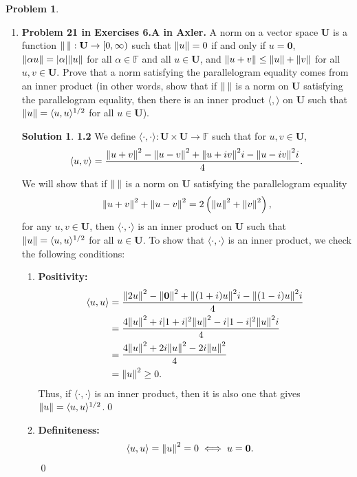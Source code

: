\documentclass{book}
\theoremstyle{definition}
\newtheorem*{prob*}{Problem}
\newtheorem*{sln*}{Solution}
\newcommand{\U}{\mathbf{U}}
\newcommand{\la}{\langle}
\newcommand{\ra}{\rangle}
\begin{document}
\begin{prob*}
\begin{enumerate}
		
		\newpage
		
		
		
		\item \textbf{Problem 21 in Exercises 6.A in Axler.} A norm on a vector space $\U$ is a function $\norm{\,}: \U \to [0,\infty) $ such that $\norm{u} = 0$ if and only if $u = \mathbf{0}$, $\norm{\alpha u} = \vert \alpha \vert \norm{u}$ for all $\alpha \in \mathbb{F}$ and all $u \in \U$, and $\norm{u + v} \leq \norm{u} + \norm{v}$ for all $u,v \in \U$. Prove that a norm satisfying the parallelogram equality comes from an inner product (in other words, show that if $\norm{\,}$ is a norm on $\U$ satisfying the parallelogram equality, then there is an inner product $\la ,\ra$ on $\U$ such that $\norm{u} = \la u,u\ra^{1/2}$ for all $u\in \U$). 
		
		
		\begin{sln*}\textbf{1.2}
			We define $\la \cdot,\cdot \ra : \U \times \U \to \mathbb{F}$ such that for $u,v \in \U$,
			\begin{align*}
			\la u ,v \ra = \frac{\norm{u+ v}^2  - \norm{u-v}^2 + \norm{u + iv}^2i - \norm{u - iv}^2i   }{4}.
			\end{align*} 
			We will show that if $\norm{\,}$ is a norm on $\U$ satisfying the parallelogram equality 
			\begin{align*}
			\norm{u+v}^2 + \norm{u-v}^2 = 2   \left( \norm{u}^2 + \norm{v}^2 \right),
			\end{align*}
			for any $u,v \in \U$, then $\la \cdot,\cdot\ra$ is an inner product on $\U$ such that $\norm{u} = \la u,u\ra^{1/2}$ for all $u\in \U$.  To show that $\la \cdot , \cdot \ra$ is an inner product, we check the following conditions:
			\begin{enumerate}
				\item \textbf{Positivity:}
				\begin{align*}
				\la u ,u \ra &= \frac{\norm{2u}^2  - \norm{\mathbf{0}}^2 + \norm{(1+i)u}^2i - \norm{(1-i)u}^2i   }{4}\\
				&= \frac{4\norm{u}^2 + i\vert 1+i\vert^2 \norm{u}^2 - i\vert 1 - i \vert^2 \norm{u}^2i   }{4}\\
				&= \frac{4\norm{u}^2 + 2i \norm{u}^2 - 2i \norm{u}^2  }{4}\\
				&= \norm{u}^2 \geq 0.
				\end{align*}
				Thus, if $\la \cdot, \cdot \ra$ is an inner product, then it is also one that gives $\norm{u} = \la u,u\ra^{1/2}$.\qed
				
				\item \textbf{Definiteness:}
				\begin{align*}
				\la u ,u \ra &= \norm{u}^2 = 0 \iff u = \mathbf{0}. 
				\end{align*}\qed
				

\end{enumerate}
\end{sln*}
\end{enumerate}
\end{prob*}
\end{document}
